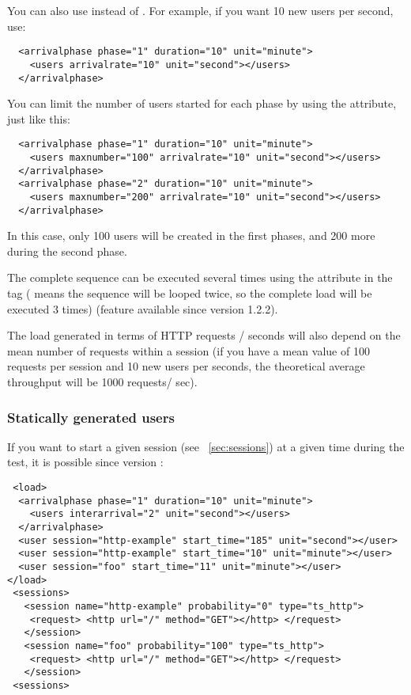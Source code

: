\documentclass{TSUNG-en}
\begin{document}
You can also use  instead of
. For example, if you want 10 new users per
second, use:

\begin{Verbatim}
  <arrivalphase phase="1" duration="10" unit="minute">
    <users arrivalrate="10" unit="second"></users>
  </arrivalphase>
\end{Verbatim}

You can limit the number of users started for each phase by using the
 attribute, just like this:
\begin{Verbatim}
  <arrivalphase phase="1" duration="10" unit="minute">
    <users maxnumber="100" arrivalrate="10" unit="second"></users>
  </arrivalphase>
  <arrivalphase phase="2" duration="10" unit="minute">
    <users maxnumber="200" arrivalrate="10" unit="second"></users>
  </arrivalphase>
\end{Verbatim}
In this case, only 100 users will be created in the first phases, and
200 more during the second phase.


The complete sequence can be executed several times using the
 attribute in the  tag
( means the sequence will be looped twice, so the
complete load will be executed 3 times) (feature available since
version 1.2.2).

The load generated in terms of HTTP requests / seconds will also
depend on the mean number of requests within a session (if you have a
mean value of 100 requests per session and 10 new users per seconds,
the theoretical average throughput will be 1000 requests/ sec).

\subsubsection{Statically generated users}

If you want to start a given session (see ~\ref{sec:sessions}) at a given time during the test,
it is possible since version :
\begin{Verbatim}
 <load>
  <arrivalphase phase="1" duration="10" unit="minute">
    <users interarrival="2" unit="second"></users>
  </arrivalphase>
  <user session="http-example" start_time="185" unit="second"></user>
  <user session="http-example" start_time="10" unit="minute"></user>
  <user session="foo" start_time="11" unit="minute"></user>
</load>
 <sessions>
   <session name="http-example" probability="0" type="ts_http">
    <request> <http url="/" method="GET"></http> </request>
   </session>
   <session name="foo" probability="100" type="ts_http">
    <request> <http url="/" method="GET"></http> </request>
   </session>
 <sessions>
\end{Verbatim}
\end{document}
